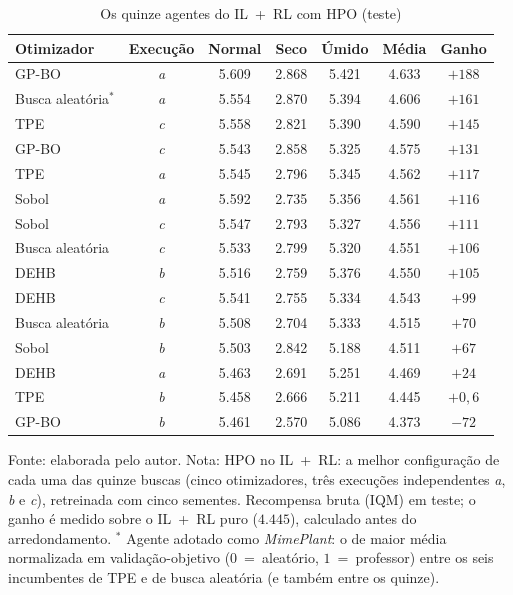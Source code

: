 \begin{table}[htbp]
\centering
\small\setlength{\tabcolsep}{3pt}
\caption{Os quinze agentes do IL~+~RL com HPO (teste)}
\label{tab:otimizadores}
\begin{tabular}{l c c c c c c}
\hline
\textbf{Otimizador} & \textbf{Execução} & \textbf{Normal} & \textbf{Seco} & \textbf{Úmido} & \textbf{Média} & \textbf{Ganho} \\ \hline
GP-BO & \textit{a} & 5.609 & 2.868 & 5.421 & 4.633 & $+188$ \\
Busca aleatória$^{*}$ & \textit{a} & 5.554 & 2.870 & 5.394 & 4.606 & $+161$ \\
TPE & \textit{c} & 5.558 & 2.821 & 5.390 & 4.590 & $+145$ \\
GP-BO & \textit{c} & 5.543 & 2.858 & 5.325 & 4.575 & $+131$ \\
TPE & \textit{a} & 5.545 & 2.796 & 5.345 & 4.562 & $+117$ \\
Sobol & \textit{a} & 5.592 & 2.735 & 5.356 & 4.561 & $+116$ \\
Sobol & \textit{c} & 5.547 & 2.793 & 5.327 & 4.556 & $+111$ \\
Busca aleatória & \textit{c} & 5.533 & 2.799 & 5.320 & 4.551 & $+106$ \\
DEHB & \textit{b} & 5.516 & 2.759 & 5.376 & 4.550 & $+105$ \\
DEHB & \textit{c} & 5.541 & 2.755 & 5.334 & 4.543 & $+99$ \\
Busca aleatória & \textit{b} & 5.508 & 2.704 & 5.333 & 4.515 & $+70$ \\
Sobol & \textit{b} & 5.503 & 2.842 & 5.188 & 4.511 & $+67$ \\
DEHB & \textit{a} & 5.463 & 2.691 & 5.251 & 4.469 & $+24$ \\
TPE & \textit{b} & 5.458 & 2.666 & 5.211 & 4.445 & $+0{,}6$ \\
GP-BO & \textit{b} & 5.461 & 2.570 & 5.086 & 4.373 & $-72$ \\
\hline
\end{tabular}

{\footnotesize Fonte: elaborada pelo autor. Nota: HPO no IL~+~RL: a melhor configuração de cada uma das quinze buscas (cinco otimizadores, três execuções independentes \textit{a}, \textit{b} e \textit{c}), retreinada com cinco sementes. Recompensa bruta (IQM) em teste; o ganho é medido sobre o IL~+~RL puro ($4.445$), calculado antes do arredondamento. $^{*}$ Agente adotado como \textit{MimePlant}: o de maior média normalizada em validação-objetivo ($0$~=~aleatório, $1$~=~professor) entre os seis incumbentes de TPE e de busca aleatória (e também entre os quinze).}
\end{table}
